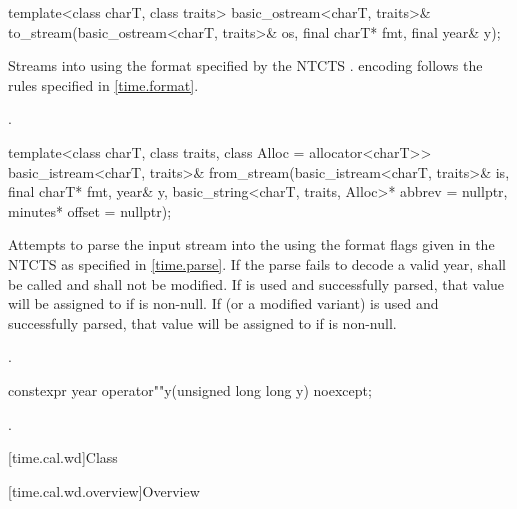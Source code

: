 %
\begin{itemdecl}
template<class charT, class traits>
  basic_ostream<charT, traits>&
    to_stream(basic_ostream<charT, traits>& os, final charT* fmt, final year& y);
\end{itemdecl}

\begin{itemdescr}
\pnum
\effects
Streams  into  using
the format specified by the NTCTS .
 encoding follows the rules specified in \ref{time.format}.

\pnum
\returns {}.
\end{itemdescr}

%
\begin{itemdecl}
template<class charT, class traits, class Alloc = allocator<charT>>
  basic_istream<charT, traits>&
    from_stream(basic_istream<charT, traits>& is, final charT* fmt,
                year& y, basic_string<charT, traits, Alloc>* abbrev = nullptr,
                minutes* offset = nullptr);
\end{itemdecl}

\begin{itemdescr}
\pnum
\effects
Attempts to parse the input stream 
into the   using
the format flags given in the NTCTS 
as specified in \ref{time.parse}.
If the parse fails to decode a valid year,
 shall be called
and  shall not be modified.
If  is used and successfully parsed,
that value will be assigned to  if  is non-null.
If  (or a modified variant) is used and successfully parsed,
that value will be assigned to  if  is non-null.

\pnum
\returns {}.
\end{itemdescr}

%
\begin{itemdecl}
constexpr year operator""y(unsigned long long y) noexcept;
\end{itemdecl}

\begin{itemdescr}
\pnum
\returns {}.
\end{itemdescr}

[time.cal.wd]{Class }

[time.cal.wd.overview]{Overview}

